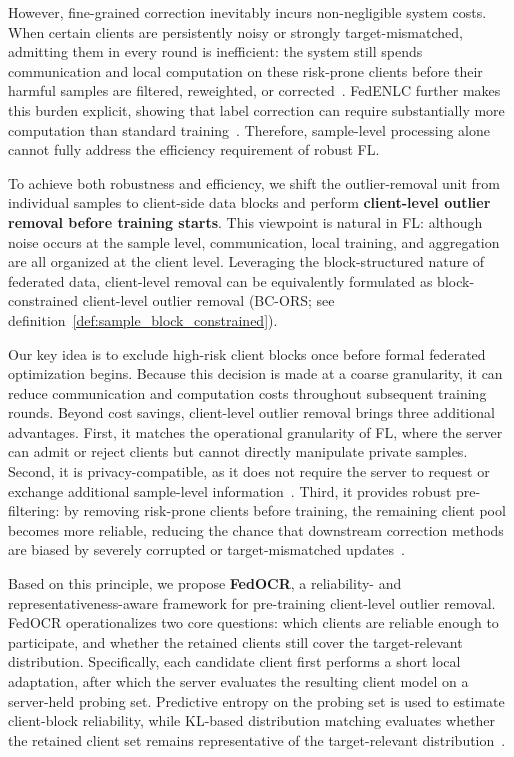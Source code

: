 ﻿\documentclass[conference]{IEEEtran}
\theoremstyle{definition}
\theoremstyle{remark}
\begin{document}
However, fine-grained correction inevitably incurs non-negligible system costs. When certain clients are persistently noisy or strongly target-mismatched, admitting them in every round is inefficient: the system still spends communication and local computation on these risk-prone clients before their harmful samples are filtered, reweighted, or corrected~\cite{kairouz2021advances,xu2022fedcorr,hao2025fedcs}. FedENLC further makes this burden explicit, showing that label correction can require substantially more computation than standard training~\cite{cho2026fedenlc}. Therefore, sample-level processing alone cannot fully address the efficiency requirement of robust FL.

To achieve both robustness and efficiency, we shift the outlier-removal unit from individual samples to client-side data blocks and perform \textbf{client-level outlier removal before training starts}. This viewpoint is natural in FL: although noise occurs at the sample level, communication, local training, and aggregation are all organized at the client level. Leveraging the block-structured nature of federated data, client-level removal can be equivalently formulated as block-constrained client-level outlier removal (BC-ORS; see definition~\ref{def:sample_block_constrained}).

Our key idea is to exclude high-risk client blocks once before formal federated optimization begins. Because this decision is made at a coarse granularity, it can reduce communication and computation costs throughout subsequent training rounds. Beyond cost savings, client-level outlier removal brings three additional advantages. First, it matches the operational granularity of FL, where the server can admit or reject clients but cannot directly manipulate private samples. Second, it is privacy-compatible, as it does not require the server to request or exchange additional sample-level information~\cite{kairouz2021advances}. Third, it provides robust pre-filtering: by removing risk-prone clients before training, the remaining client pool becomes more reliable, reducing the chance that downstream correction methods are biased by severely corrupted or target-mismatched updates~\cite{xu2022fedcorr,wu2023fednoro,ji2024fedfixer}.

Based on this principle, we propose \textbf{FedOCR}, a reliability- and representativeness-aware framework for pre-training client-level outlier removal. FedOCR operationalizes two core questions: which clients are reliable enough to participate, and whether the retained clients still cover the target-relevant distribution. Specifically, each candidate client first performs a short local adaptation, after which the server evaluates the resulting client model on a server-held probing set. Predictive entropy on the probing set is used to estimate client-block reliability, while KL-based distribution matching evaluates whether the retained client set remains representative of the target-relevant distribution~\cite{northcutt2021confident,guo2017calibration,ben2010theory,lipton2018labelshift,hsu2019measuring,zhu2021survey,zhang2023dpp}.
\end{document}
